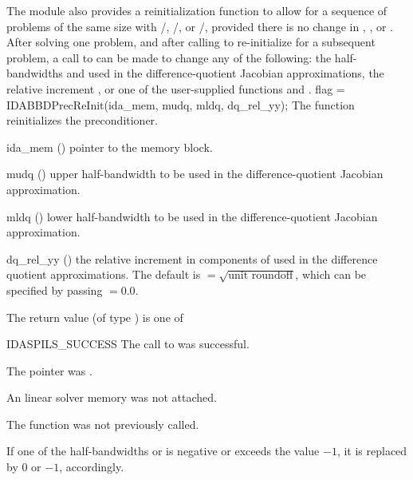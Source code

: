 {The {\idabbdpre} module also provides a reinitialization function to allow
for a sequence of problems of the same size with {\idaspgmr}/{\idabbdpre},
{\idaspbcg}/{\idabbdpre}, or {\idasptfqmr}/{\idabbdpre}, provided there is no
change in , , or .
After solving one problem, and after calling  to re-initialize 
{\ida} for a subsequent problem, a call to  can be made
to change any of the following: the half-bandwidths  and  
used in the difference-quotient Jacobian approximations, the relative increment 
, or one of the user-supplied functions  and .
{
  flag = IDABBDPrecReInit(ida\_mem, mudq, mldq, dq\_rel\_yy);
}
{
  The function  reinitializes the {\idabbdpre} preconditioner.
}
{
  \begin{args}[dq\_rel\_yy]
  \item[ida\_mem] ()
    pointer to the {\ida} memory block.
  \item[mudq] ()
    upper half-bandwidth to be used in the difference-quotient Jacobian approximation.
  \item[mldq] ()
    lower half-bandwidth to be used in the difference-quotient Jacobian approximation.
  \item[dq\_rel\_yy] ()
    the relative increment in components of  used in the difference quotient
    approximations.  
    The default is  $= \sqrt{\text{unit roundoff}}$, which
    can be specified by passing  $= 0.0$.
  \end{args}
}
{
  The return value  (of type ) is one of
  \begin{args}
  \item[IDASPILS\_SUCCESS]
    The call to  was successful.
  \item[\id{IDASPILS\_MEM\_NULL}] 
    The  pointer was .
  \item[\Id{IDASPILS\_LMEM\_NULL}]
    An {\idaspils} linear solver memory was not attached.
  \item[\Id{IDASPILS\_PMEM\_NULL}]
    The function  was not previously called.
  \end{args}
}
{
  If one of the half-bandwidths  or  is negative or
  exceeds the value $-1$, it is replaced by 0 or $-1$,
  accordingly.
}}
